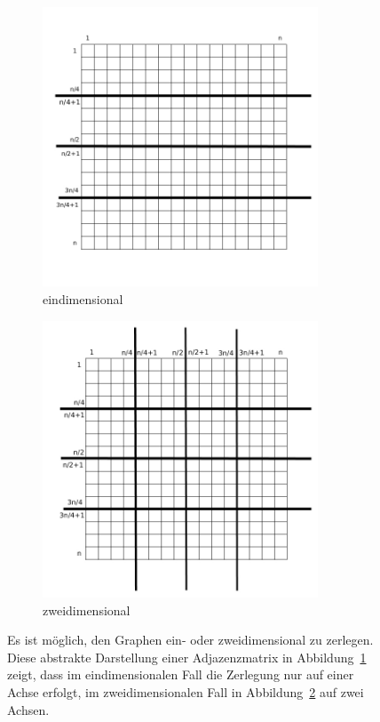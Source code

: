 \documentclass[11pt,a4paper]{article}
\begin{document}
\begin{figure}[h]
    \centering
    \begin{subfigure}[b]{0.45\textwidth}
        \includegraphics[width=0.9\textwidth]{eindim}
        \caption{eindimensional}
        \label{fig:eindim}
    \end{subfigure}
   \qquad
    \begin{subfigure}[b]{0.47\textwidth}
        \includegraphics[width=0.9\textwidth]{zweidim}
        \caption{zweidimensional}
        \label{fig:zweidim}
    \end{subfigure}
    \caption{Es ist möglich, den Graphen ein- oder zweidimensional zu zerlegen. Diese abstrakte Darstellung einer Adjazenzmatrix in Abbildung~\ref{fig:eindim} zeigt, dass im eindimensionalen Fall die Zerlegung nur auf einer Achse erfolgt, im zweidimensionalen Fall in Abbildung~\ref{fig:zweidim} auf zwei Achsen.}
\label{fig:zerlegung}
\end{figure}
\end{document}
